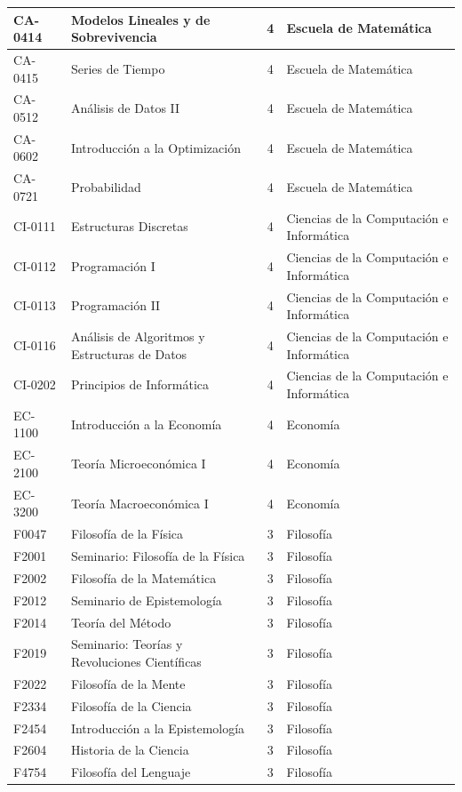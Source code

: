 \begin{longtable}{|l|>{\raggedright\arraybackslash}p{6cm}|c|>{\raggedright\arraybackslash}p{4.2cm}|}
CA-0414 & Modelos Lineales y de Sobrevivencia & 4 & Escuela de Matemática \\ \hline
CA-0415 & Series de Tiempo & 4 & Escuela de Matemática \\ \hline
CA-0512 & Análisis de Datos II & 4 & Escuela de Matemática \\ \hline
CA-0602 & Introducción a la Optimización & 4 & Escuela de Matemática \\ \hline
CA-0721 & Probabilidad & 4 & Escuela de Matemática \\ \hline
CI-0111 & Estructuras Discretas & 4 & Ciencias de la Computación e Informática \\ \hline
CI-0112 & Programación I & 4 & Ciencias de la Computación e Informática \\ \hline
CI-0113 & Programación II & 4 & Ciencias de la Computación e Informática \\ \hline
CI-0116 & Análisis de Algoritmos y Estructuras de Datos & 4 & Ciencias de la Computación e Informática \\ \hline
CI-0202 & Principios de Informática & 4 & Ciencias de la Computación e Informática \\ \hline
EC-1100 & Introducción a la Economía & 4 & Economía \\ \hline
EC-2100 & Teoría Microeconómica I & 4 & Economía \\ \hline
EC-3200 & Teoría Macroeconómica I & 4 & Economía \\ \hline
F0047 & Filosofía de la Física & 3 & Filosofía \\ \hline
F2001 & Seminario: Filosofía de la Física & 3 & Filosofía \\ \hline
F2002 & Filosofía de la Matemática & 3 & Filosofía \\ \hline
F2012 & Seminario de Epistemología & 3 & Filosofía \\ \hline
F2014 & Teoría del Método & 3 & Filosofía \\ \hline
F2019 & Seminario: Teorías y Revoluciones Científicas & 3 & Filosofía \\ \hline
F2022 & Filosofía de la Mente & 3 & Filosofía \\ \hline
F2334 & Filosofía de la Ciencia & 3 & Filosofía \\ \hline
F2454 & Introducción a la Epistemología & 3 & Filosofía \\ \hline
F2604 & Historia de la Ciencia & 3 & Filosofía \\ \hline
F4754 & Filosofía del Lenguaje & 3 & Filosofía \\ \hline

\end{longtable}
